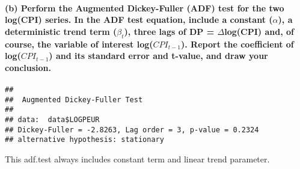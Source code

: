 \documentclass[]{article}
\newenvironment{Shaded}{\begin{snugshade}}{\end{snugshade}}
\newcommand{\DataTypeTok}[1]{\textcolor[rgb]{0.13,0.29,0.53}{#1}}
\newcommand{\DecValTok}[1]{\textcolor[rgb]{0.00,0.00,0.81}{#1}}
\newcommand{\KeywordTok}[1]{\textcolor[rgb]{0.13,0.29,0.53}{\textbf{#1}}}
\newcommand{\NormalTok}[1]{#1}
\newcommand{\OperatorTok}[1]{\textcolor[rgb]{0.81,0.36,0.00}{\textbf{#1}}}
\newcommand{\StringTok}[1]{\textcolor[rgb]{0.31,0.60,0.02}{#1}}
\let\oldparagraph\paragraph
\renewcommand{\paragraph}[1]{\oldparagraph{#1}\mbox{}}
\begin{document}
\hypertarget{b-perform-the-augmented-dickey-fuller-adf-test-for-the-two-logcpi-series.-in-the-adf-test-equation-include-a-constant-alpha-a-deterministic-trend-term-beta_t-three-lags-of-dp-deltalogcpi-and-of-course-the-variable-of-interest-logcpi_t-1.-report-the-coefficient-of-logcpi_t-1-and-its-standard-error-and-t-value-and-draw-your-conclusion.}{%
\paragraph{\texorpdfstring{(b) Perform the Augmented Dickey-Fuller (ADF)
test for the two log(CPI) series. In the ADF test equation, include a
constant (\(\alpha\)), a deterministic trend term (\(\beta_t\)), three
lags of DP = \(\Delta\)log(CPI) and, of course, the variable of interest
log(\(CPI_{t-1}\)). Report the coefficient of log(\(CPI_{t-1}\)) and its
standard error and t-value, and draw your
conclusion.}{(b) Perform the Augmented Dickey-Fuller (ADF) test for the two log(CPI) series. In the ADF test equation, include a constant (\textbackslash alpha), a deterministic trend term (\textbackslash beta\_t), three lags of DP = \textbackslash Deltalog(CPI) and, of course, the variable of interest log(CPI\_\{t-1\}). Report the coefficient of log(CPI\_\{t-1\}) and its standard error and t-value, and draw your conclusion.}}\label{b-perform-the-augmented-dickey-fuller-adf-test-for-the-two-logcpi-series.-in-the-adf-test-equation-include-a-constant-alpha-a-deterministic-trend-term-beta_t-three-lags-of-dp-deltalogcpi-and-of-course-the-variable-of-interest-logcpi_t-1.-report-the-coefficient-of-logcpi_t-1-and-its-standard-error-and-t-value-and-draw-your-conclusion.}}

\begin{Shaded}
\end{Shaded}

\begin{verbatim}
## 
##  Augmented Dickey-Fuller Test
## 
## data:  data$LOGPEUR
## Dickey-Fuller = -2.8263, Lag order = 3, p-value = 0.2324
## alternative hypothesis: stationary
\end{verbatim}

This adf.test always includes constant term and linear trend parameter.
\end{document}
